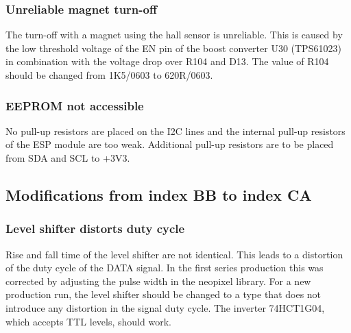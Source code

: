 \subsubsection{Unreliable magnet turn-off}
The turn-off with a magnet using the hall sensor is unreliable. This is caused by the low threshold voltage of the EN pin of the boost converter U30 (TPS61023) in combination with the voltage drop over R104 and D13. The value of R104 should be changed from 1K5/0603 to 620R/0603. 

\subsubsection{EEPROM not accessible}
No pull-up resistors are placed on the \ac{I2C} lines and the internal pull-up resistors of the ESP module are too weak. Additional pull-up resistors are to be placed from SDA and SCL to +3V3. 

\subsection{Modifications from index BB to index CA}

\subsubsection{Level shifter distorts duty cycle}
Rise and fall time of the level shifter are not identical. This leads to a distortion of the duty cycle of the DATA signal. In the first series production this was corrected by adjusting the pulse width in the neopixel library. 
For a new production run, the level shifter should be changed to a type that does not introduce any distortion in the signal duty cycle. 
The inverter 74HCT1G04, which accepts TTL levels, should work. 
